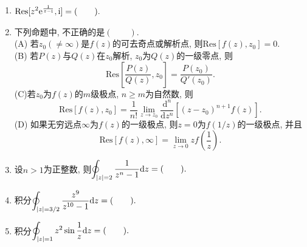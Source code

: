 \begin{yyEx}
\begin{enumerate}
		\item $\begin{lgathered}
			\mathrm{Res}[z^2\mathrm{e}^{\frac{1}{z-\mathrm{i}}},\mathrm{i}] = (\quad\quad).
		\end{lgathered}$
		\item 下列命题中, 不正确的是$(\quad\quad)$.\\
			(A) 若$z_0(\neq\infty)$是$f(z)$的可去奇点或解析点, 则$\mathrm{Res}[f(z),z_0] = 0$.\\
			(B) 若$P(z)$与$Q(z)$在$z_0$解析, $z_0$为$Q(z)$的一级零点, 则
				\begin{equation*}
					\mathrm{Res}\left[ \frac{P(z)}{Q(z)},z_0 \right] = \frac{P(z_0)}{Q'(z_0)}.
				\end{equation*}
			(C)若$z_0$为$f(z)$的$m$级极点, $n\geqslant m$为自然数, 则
				\begin{equation*}
					\mathrm{Res}[f(z),z_0] = \frac{1}{n!}\lim\limits_{z\to z_0}\frac{\mathrm{d}^n}{\mathrm{d}z^n}[(z-z_0)^{n+1}f(z)].
				\end{equation*}
			(D) 如果无穷远点$\infty$为$f(z)$的一级极点, 则$z = 0$为$f(1/z)$的一级极点, 并且\begin{equation*}
				\mathrm{Res}[f(z),\infty] = \lim\limits_{z\to 0}zf\left(\frac{1}{z}\right).
			\end{equation*}
		\item 设$n>1$为正整数, 则$\begin{lgathered}
			\oint_{\abs{z} = 2} \frac{1}{z^n-1}\mathrm{d}z = (\quad\quad).
		\end{lgathered}$
		\item 积分$\begin{lgathered}
		\oint_{\abs{z} = 3/2} \frac{z^9}{z^{10}-1}\mathrm{d}z = (\quad\quad).
		\end{lgathered}$
		\item 积分$\begin{lgathered}
		\oint_{\abs{z} = 1} z^2\sin\frac{1}{z}\mathrm{d}z = (\quad\quad).
		\end{lgathered}$
	\end{enumerate}
\end{yyEx}

